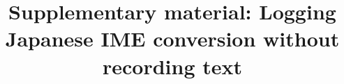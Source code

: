 \documentclass[pdflatex,sn-apa]{sn-jnl}
\begin{document}
\title{Supplementary material: Logging Japanese IME conversion without recording text}

\maketitle



\clearpage


\clearpage


\clearpage


\clearpage


\clearpage


\clearpage


\clearpage


\clearpage

\end{document}
